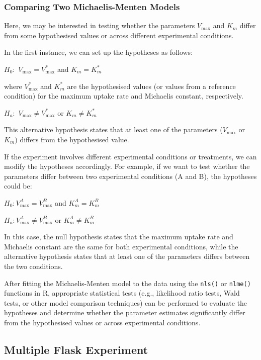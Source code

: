 \documentclass[
  letterpaper,
]{book}
\begin{document}
\subsubsection{Comparing Two Michaelis-Menten
Models}\label{sec-mm-comparison}

Here, we may be interested in testing whether the parameters
\(V_\text{max}\) and \(K_m\) differ from some hypothesised values or
across different experimental conditions.

In the first instance, we can set up the hypotheses as follows:

\textbf{\(H_0:\)} \(V_\text{max} = V_\text{max}^*\) and \(K_m = K_m^*\)

where \(V_\text{max}^*\) and \(K_m^*\) are the hypothesised values (or
values from a reference condition) for the maximum uptake rate and
Michaelis constant, respectively.

\textbf{\(H_a:\)} \(V_\text{max} \neq V_\text{max}^*\) or
\(K_m \neq K_m^*\)

This alternative hypothesis states that at least one of the parameters
(\(V_\text{max}\) or \(K_m\)) differs from the hypothesised value.

If the experiment involves different experimental conditions or
treatments, we can modify the hypotheses accordingly. For example, if we
want to test whether the parameters differ between two experimental
conditions (A and B), the hypotheses could be:

\(H_0: V_\text{max}^A = V_\text{max}^B\) and \(K_m^A = K_m^B\)

\(H_a: V_\text{max}^A \neq V_\text{max}^B\) or \(K_m^A \neq K_m^B\)

In this case, the null hypothesis states that the maximum uptake rate
and Michaelis constant are the same for both experimental conditions,
while the alternative hypothesis states that at least one of the
parameters differs between the two conditions.

After fitting the Michaelis-Menten model to the data using the
\texttt{nls()} or \texttt{nlme()} functions in R, appropriate
statistical tests (e.g., likelihood ratio tests, Wald tests, or other
model comparison techniques) can be performed to evaluate the hypotheses
and determine whether the parameter estimates significantly differ from
the hypothesised values or across experimental conditions.

\subsection{Multiple Flask Experiment}\label{multiple-flask-experiment}
\end{document}
